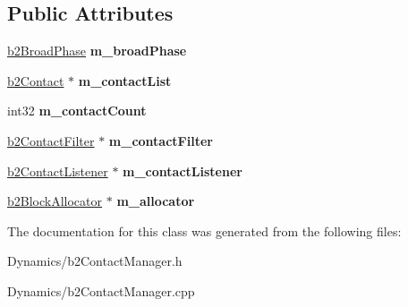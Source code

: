 \subsection*{Public Attributes}
\begin{DoxyCompactItemize}
\item 
\mbox{\label{classb2ContactManager_af85a9c7b0fb138b9fb635dbcf3b0b482}} 
\mbox{\hyperlink{classb2BroadPhase}{b2\+Broad\+Phase}} {\bfseries m\+\_\+broad\+Phase}
\item 
\mbox{\label{classb2ContactManager_aaca5f490daffabd29f7ad809921224b3}} 
\mbox{\hyperlink{classb2Contact}{b2\+Contact}} $\ast$ {\bfseries m\+\_\+contact\+List}
\item 
\mbox{\label{classb2ContactManager_a115b2f9bf38ffd045b26ae91ea696288}} 
int32 {\bfseries m\+\_\+contact\+Count}
\item 
\mbox{\label{classb2ContactManager_accf0e9232b9eeff002220ecb8d37a17f}} 
\mbox{\hyperlink{classb2ContactFilter}{b2\+Contact\+Filter}} $\ast$ {\bfseries m\+\_\+contact\+Filter}
\item 
\mbox{\label{classb2ContactManager_ac3565501f5ab42323050712b244bfe9a}} 
\mbox{\hyperlink{classb2ContactListener}{b2\+Contact\+Listener}} $\ast$ {\bfseries m\+\_\+contact\+Listener}
\item 
\mbox{\label{classb2ContactManager_a20c57f602aa349239df715de5294821d}} 
\mbox{\hyperlink{classb2BlockAllocator}{b2\+Block\+Allocator}} $\ast$ {\bfseries m\+\_\+allocator}
\end{DoxyCompactItemize}


The documentation for this class was generated from the following files\+:\begin{DoxyCompactItemize}
\item 
Dynamics/b2\+Contact\+Manager.\+h\item 
Dynamics/b2\+Contact\+Manager.\+cpp\end{DoxyCompactItemize}

